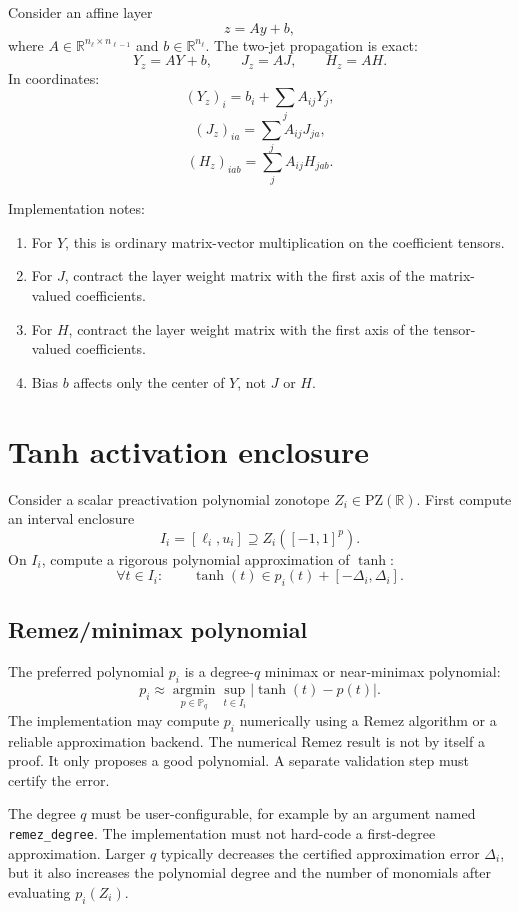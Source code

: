 \documentclass[11pt]{article}
\newcommand{\R}{\mathbb{R}}
\newcommand{\PZ}{\mathrm{PZ}}
\begin{document}
Consider an affine layer
\[
    z=Ay+b,
\]
where \(A\in\R^{n_\ell\times n_{\ell-1}}\) and \(b\in\R^{n_\ell}\). The two-jet propagation is exact:
\[
    Y_z=AY+b,
    \qquad
    J_z=AJ,
    \qquad
    H_z=AH.
\]
In coordinates:
\[
    (Y_z)_i
    =
    b_i+\sum_j A_{ij}Y_j,
\]
\[
    (J_z)_{ia}
    =
    \sum_j A_{ij}J_{ja},
\]
\[
    (H_z)_{iab}
    =
    \sum_j A_{ij}H_{jab}.
\]

Implementation notes:
\begin{enumerate}[label=(\roman*)]
    \item For \(Y\), this is ordinary matrix-vector multiplication on the coefficient tensors.
    \item For \(J\), contract the layer weight matrix with the first axis of the matrix-valued coefficients.
    \item For \(H\), contract the layer weight matrix with the first axis of the tensor-valued coefficients.
    \item Bias \(b\) affects only the center of \(Y\), not \(J\) or \(H\).
\end{enumerate}

\section{Tanh activation enclosure}

Consider a scalar preactivation polynomial zonotope \(Z_i\in\PZ(\R)\). First compute an interval enclosure
\[
    I_i=[\ell_i,u_i]
    \supseteq
    Z_i([-1,1]^p).
\]
On \(I_i\), compute a rigorous polynomial approximation of \(\tanh\):
\[
    \forall t\in I_i:
    \qquad
    \tanh(t)\in p_i(t)+[-\Delta_i,\Delta_i].
\]

\subsection{Remez/minimax polynomial}

The preferred polynomial \(p_i\) is a degree-\(q\) minimax or near-minimax polynomial:
\[
    p_i
    \approx
    \operatorname*{argmin}_{p\in\mathbb{P}_q}
    \sup_{t\in I_i}|\tanh(t)-p(t)|.
\]
The implementation may compute \(p_i\) numerically using a Remez algorithm or a reliable approximation backend. The numerical Remez result is not by itself a proof. It only proposes a good polynomial. A separate validation step must certify the error.

The degree \(q\) must be user-configurable, for example by an argument named \texttt{remez\_degree}. The implementation must not hard-code a first-degree approximation. Larger \(q\) typically decreases the certified approximation error \(\Delta_i\), but it also increases the polynomial degree and the number of monomials after evaluating \(p_i(Z_i)\).
\end{document}

